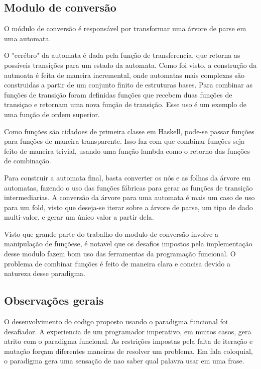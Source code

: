 \subsection{Modulo de conversão}
O módulo de conversão é responsável por transformar uma árvore de parse em uma automata.

O "cerébro" da automata é dada pela função de transferencia, que retorna as possíveis transições para um estado da automata.
Como foi visto, a construção da autmoata é feita de maneira incremental, onde automatas mais complexas são construidas a partir de um conjunto finito de estruturas bases.
Para combinar as funções de transição foram definidas funções que recebem duas funções de transiçao e retornam uma nova função de transição.
Esse uso é um exemplo de uma função de ordem superior.

Como funções são cidadoes de primeira classe em Haskell, pode-se passar funções para funções de maneira transparente.
Isso faz com que combinar funções seja feito de maneira trivial, usando uma função lambda como o retorno das funções de combinação.

Para construir a automata final, basta converter os nós e as folhas da árvore em automatas, fazendo o uso das funções fábricas para gerar as funções de transição intermediarias.
A conversão da árvore para uma automata é mais um caso de uso para um fold, visto que deseja-se iterar sobre a árvore de parse, um tipo de dado multi-valor, e gerar um único valor a partir dela.

Visto que grande parte do trabalho do modulo de conversão involve a manipulação de funçõese, é notavel que os desafios impostos pela implementação desse modulo fazem bom uso das ferramentas da programação funcional.
O problema de combinar funções é feito de maneira clara e concisa devido a natureza desse paradigma.

\subsection{Observações gerais}

O desenvolvimento do codigo proposto usando o paradigma funcional foi desafiador.
A experiencia de um programador imperativo, em muitos casos, gera atrito com o paradigma funcional.
As restrições impostas pela falta de iteração e mutação forçam diferentes maneiras de resolver um problema.
Em fala coloquial, o paradigma gera uma sensação de nao saber qual palavra usar em uma frase.

